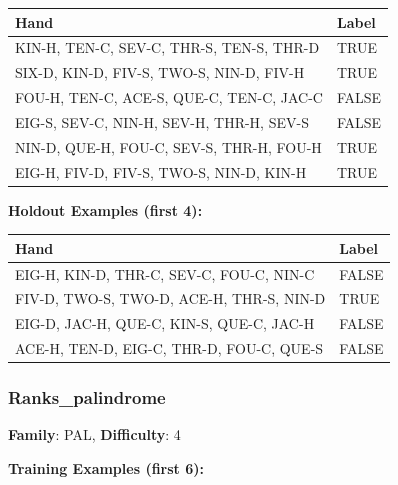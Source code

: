 \documentclass[10pt,a4paper]{article}
\begin{document}
\begin{small}
\begin{tabular}{p{8cm}l}
\toprule
Hand & Label \\
\midrule
KIN-H, TEN-C, SEV-C, THR-S, TEN-S, THR-D & \textcolor{positive}{TRUE} \\
SIX-D, KIN-D, FIV-S, TWO-S, NIN-D, FIV-H & \textcolor{positive}{TRUE} \\
FOU-H, TEN-C, ACE-S, QUE-C, TEN-C, JAC-C & \textcolor{negative}{FALSE} \\
EIG-S, SEV-C, NIN-H, SEV-H, THR-H, SEV-S & \textcolor{negative}{FALSE} \\
NIN-D, QUE-H, FOU-C, SEV-S, THR-H, FOU-H & \textcolor{positive}{TRUE} \\
EIG-H, FIV-D, FIV-S, TWO-S, NIN-D, KIN-H & \textcolor{positive}{TRUE} \\
\bottomrule
\end{tabular}
\end{small}

\textbf{Holdout Examples (first 4):}

\begin{small}
\begin{tabular}{p{8cm}l}
\toprule
Hand & Label \\
\midrule
EIG-H, KIN-D, THR-C, SEV-C, FOU-C, NIN-C & \textcolor{negative}{FALSE} \\
FIV-D, TWO-S, TWO-D, ACE-H, THR-S, NIN-D & \textcolor{positive}{TRUE} \\
EIG-D, JAC-H, QUE-C, KIN-S, QUE-C, JAC-H & \textcolor{negative}{FALSE} \\
ACE-H, TEN-D, EIG-C, THR-D, FOU-C, QUE-S & \textcolor{negative}{FALSE} \\
\bottomrule
\end{tabular}
\end{small}

\vspace{0.5cm}

\subsubsection{Ranks\_palindrome}

\textbf{Family}: PAL, \textbf{Difficulty}: 4

\textbf{Training Examples (first 6):}
\end{document}
